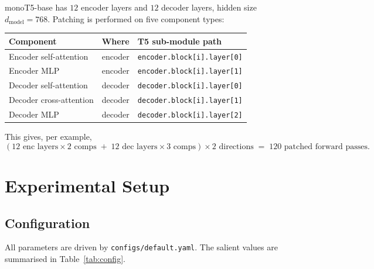 \documentclass[11pt]{article}
\begin{document}
monoT5-base has $12$ encoder layers and $12$ decoder layers, hidden size
$d_{\text{model}}=768$. Patching is performed on five component types:

\begin{center}
\begin{tabular}{lll}
\toprule
Component & Where & T5 sub-module path \\
\midrule
Encoder self-attention  & encoder & \texttt{encoder.block[i].layer[0]} \\
Encoder MLP             & encoder & \texttt{encoder.block[i].layer[1]} \\
Decoder self-attention  & decoder & \texttt{decoder.block[i].layer[0]} \\
Decoder cross-attention & decoder & \texttt{decoder.block[i].layer[1]} \\
Decoder MLP             & decoder & \texttt{decoder.block[i].layer[2]} \\
\bottomrule
\end{tabular}
\end{center}

This gives, per example,
\[
(12 \text{ enc layers} \times 2 \text{ comps} \;+\; 12 \text{ dec layers} \times 3 \text{ comps})
\times 2 \text{ directions} \;=\; 120 \text{ patched forward passes.}
\]

\section{Experimental Setup}

\subsection{Configuration}

All parameters are driven by \texttt{configs/default.yaml}. The salient values
are summarised in Table~\ref{tab:config}.
\end{document}
